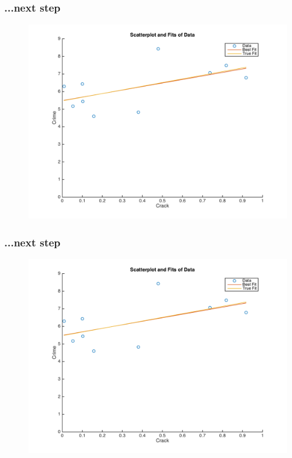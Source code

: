 \documentclass{beamer}
\begin{document}
\begin{frame}
\frametitle[alignment=center]{...next step}
\begin{figure}
\centering
\includegraphics[scale=0.5]{Newton_OLS_Figure_26.png}
\end{figure}
\end{frame}

\begin{frame}
\frametitle[alignment=center]{...next step}
\begin{figure}
\centering
\includegraphics[scale=0.5]{Newton_OLS_Figure_27.png}
\end{figure}
\end{frame}
\end{document}
